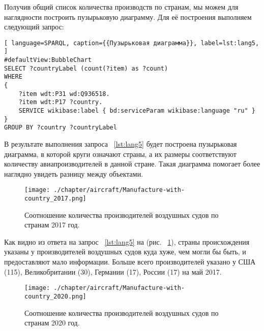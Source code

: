 
Получив общий список количества производств по странам, мы можем для наглядности построить пузырьковую диаграмму. Для её построения выполняем следующий запрос:

\begin{lstlisting}[ language=SPARQL, caption={{Пузырьковая диаграмма}}, label=lst:lang5, ]
#defaultView:BubbleChart
SELECT ?countryLabel (count(?item) as ?count)
WHERE
{
    ?item wdt:P31 wd:Q936518.
  	?item wdt:P17 ?country.
    SERVICE wikibase:label { bd:serviceParam wikibase:language "ru" }
}
GROUP BY ?country ?countryLabel
\end{lstlisting}

В результате выполнения запроса ~\ref{lst:lang5} будет построена пузырьковая диаграмма, в которой круги означают страны, а их размеры соответствуют количеству авиапроизводителей в данной стране. Такая диаграмма помогает более наглядно увидеть разницу между объектами.
 
\begin{figure}[h!]
\centering
	\texttt{[image: ./chapter/aircraft/Manufacture-with-country\_2017.png]}
	\caption{Соотношение количества производителей воздушных судов по странам 2017 год.}
	\label{fig:Manufacture_with_country_2017}
\end{figure}

Как видно из ответа на запрос ~\ref{lst:lang5} на (рис. ~\ref{fig:Manufacture_with_country_2017}), страны происхождения указаны у производителей воздушных судов куда хуже, чем могли бы быть, и предоставляют мало информации. Больше всего производителей указано у США (115), Великобритании (30), Германии (17), России (17) на май 2017.

\begin{figure}[h!]
\centering
	\texttt{[image: ./chapter/aircraft/Manufacture-with-country\_2020.png]}
	\caption{Соотношение количества производителей воздушных судов по странам 2020 год.}
	\label{fig:Manufacture_with_country_2020}
\end{figure}

\label{aircraft_question_4}

